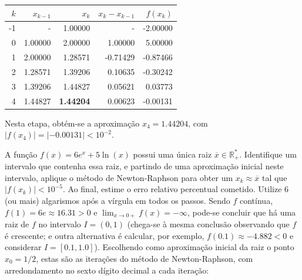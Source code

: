 \documentclass[12pt,a4paper]{article}
\newcommand*\R{\mathbb{R}}
\begin{document}
\begin{ExerciseList}
\begin{enumerate}
\begin{center}
\begin{tabular}{|r|r|r|r|r|}
\hline
$k$ & $x_{k-1}$ & $x_k$ & $x_k - x_{k-1}$ & $f(x_k)$ \\
\hline
-1 &       - & 1.00000 & -       & -2.00000 \\
\hline
 0 & 1.00000 & 2.00000 & 1.00000 & 5.00000 \\
\hline
 1 & 2.00000 & 1.28571 & -0.71429 & -0.87466 \\
\hline
 2 & 1.28571 & 1.39206 & 0.10635 & -0.30242 \\
\hline
 3 & 1.39206 & 1.44827 & 0.05621 & 0.03773 \\
\hline
 4 & 1.44827 & \textbf{1.44204} & 0.00623 & -0.00131 \\
\hline
\end{tabular}
\end{center}
\medskip
Nesta etapa, obtém-se a aproximação $x_4 = 1.44204$, com $|f(x_4)| = |-0.00131| < 10^{-2}$.
\end{enumerate}

\Exercise[title={2,0}] A função $f(x) = 6e^x + 5\ln(x)$ possui uma única raiz $\overline{x} \in \R_+^*$. Identifique um intervalo que contenha essa raiz, e partindo de uma aproximação inicial neste intervalo, aplique o método de Newton-Raphson para obter um $x_k \approx \overline{x}$ tal que $|f(x_k)| < 10^{-5}$. Ao final, estime o erro relativo percentual cometido. Utilize 6 (ou mais) algarismos após a vírgula em todos os passos.
\Answer Sendo $f$ contínua, $f(1) = 6e \approx 16.31 > 0$ e $\displaystyle\lim_{x \to 0+} f(x) = -\infty$, pode-se concluir que há uma raiz de $f$ no intervalo $I = (0, 1)$ (chega-se à mesma conclusão observando que $f$ é crescente; e outra alternativa é calcular, por exemplo, $f(0.1) \approx -4.882 < 0$ e considerar $I = [0.1, 1.0]$). Escolhendo como aproximação inicial da raiz o ponto $x_0 = 1/2$, estas são as iterações do método de Newton-Raphson, com arredondamento no sexto dígito decimal a cada iteração:


\end{ExerciseList}
\end{document}
